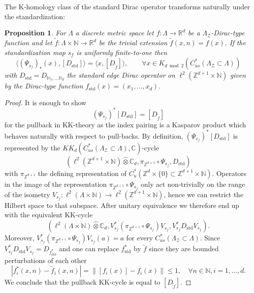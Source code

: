 \documentclass[12pt]{amsart}
\newtheorem{proposition}[theorem]{Proposition}
\newcommand{\CM}{{\mathbb C}}
\newcommand{\NM}{{\mathbb N}}
\newcommand{\RM}{{\mathbb R}}
\newcommand{\ZM}{{\mathbb Z}}
\newcommand{\Zz}{{\mathcal Z}}
\begin{document}
The K-homology class of the standard Dirac operator transforms naturally under the standardization:

\begin{proposition}
\label{prop:standardization_dirac}
For $\Lambda$ a discrete metric space let $f:\Lambda\to \RM^d$ be a $\Lambda_\Zz$-Dirac-type function and let $\tilde{f}:\Lambda\times\NM\to \RM^d$ be the trivial extension $\tilde{f}(x,n)=f(x)$. If the standardization map $s_f$ is uniformly finite-to-one then
$$\langle (\Psi_{s_f})_*(x),[D_{\mathrm{std}}]\rangle =  \langle x,[D_{\tilde{f}}]\rangle, \qquad \forall x\in K_{d\bmod 2}(C^*_{us}(\Lambda_{\Zz}\subset \Lambda))$$
with $D_{\mathrm{std}}=D_{\mathbb{H}_1,\ldots\mathbb{H}_d}$ the standard edge Dirac operator on $\ell^2(\ZM^{d+1} \times \NM)$ given by the Dirac-type function $f_{\mathrm{std}}(x)=(x_1,\ldots,x_d)$.
\end{proposition}
\begin{proof}
It is enough to show 
$$
(\Psi_{s_f})^*[D_{\mathrm{std}}]= [D_{\tilde{f}}]
$$
for the pullback in KK-theory as the index pairing is a Kasparov product which behaves naturally with respect to pull-backs. By definition, $(\Psi_{s_f})^*[D_{\mathrm{std}}]$ 
is represented by the $KK_d(C_{us}^*(\Lambda_\Zz\subset \Lambda),\CM)$-cycle
$$  (\ell^2(\ZM^{d+1}\times \NM)\hat{\otimes}\CM_d,\pi_{\ZM^{d+1}} \circ \Psi_{s_f}, D_{\mathrm{std}})
$$
with $\pi_{\ZM^{d+1}}$ the defining representation of $C^*_u(\ZM^d\times\{0\} \subset \ZM^{d+1}\times \NM)$. Operators in the image of the representation $\pi_{\ZM^{d+1}} \circ \Psi_{s_f}$ only act non-trivially on the range of the isometry $V_{s_f}:\ell^2(\Lambda\times \NM)\to \ell^2(\ZM^{d+1}\times \NM)$, hence we can restrict the Hilbert space to that subspace. After unitary equivalence we therefore end up with the equivalent KK-cycle
$$(\ell^2(\Lambda\times \NM)\hat{\otimes}\CM_d,V^*_{s_f}(\pi_{\ZM^{d+1}} \circ \Psi_{s_f}) V_{s_f}, V^*_{s_f}D_{\mathrm{std}}V_{s_f}).$$
Moreover, $V_{s_f}^*(\pi_{\ZM^{d+1}} \circ \Psi_{s_f}) V_{s_f}(a)=a$ for every $C^*_{us}(\Lambda_{\Zz}\subset \Lambda)$.
Since $V^*_{s_f}D_{\mathrm{std}}V_{s_f} = D_{f^*_{\mathrm{std}}}$ and one can replace $f^*_{\mathrm{std}}$ by $\tilde{f}$ since they are bounded perturbations of each other
$$|f^*_i(x,n) - \tilde{f}_i(x,n)| =\| [f_i(x)]- f_i(x) \| \leq 1, \quad  \forall n\in \NM, i=1,\dots,d.$$  We conclude that the pullback KK-cycle is equal to $[D_{\tilde{f}}]$.
\end{proof}
\end{document}
